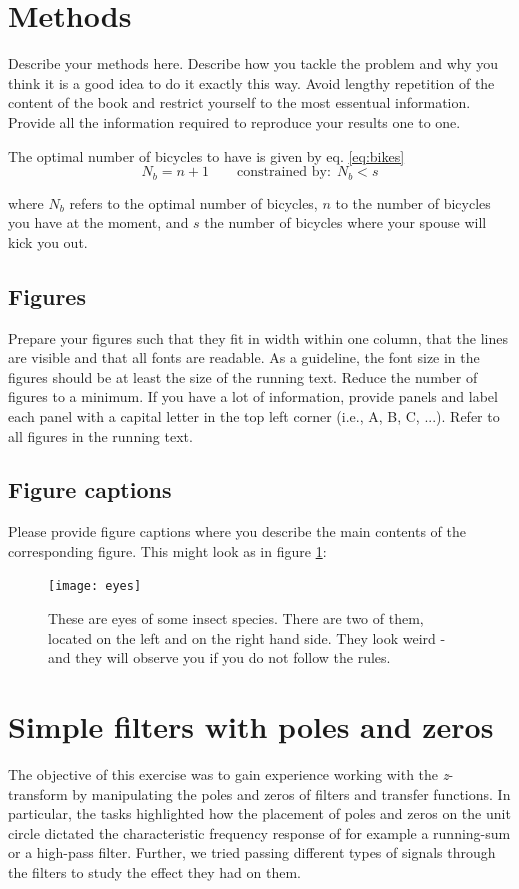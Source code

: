 \documentclass[journal]{IEEEtran}
\begin{document}
\section{Methods}
Describe your methods here. Describe how you tackle the problem and why you think it is a good idea to do it exactly this way. Avoid lengthy repetition of the content of the book and restrict yourself to the most essentual information. Provide all the information required to reproduce your results one to one.

The optimal number of bicycles to have is given by eq. \ref{eq:bikes}
\begin{equation}\label{eq:bikes}
 N_b = n + 1 \qquad \mbox{constrained by:} \ \ N_b < s
\end{equation}

where $N_b$ refers to the optimal number of bicycles, $n$ to the number of bicycles you have at the moment, and $s$ the number of bicycles where your spouse will kick you out.


\subsection{Figures}
Prepare your figures such that they fit in width within one column, that the lines are visible and that all fonts are readable. As a guideline, the font size in the figures should be at least the size of the running text. Reduce the number of figures to a minimum. If you have a lot of information, provide panels and label each panel with a capital letter in the top left corner (i.e., A, B, C, ...). Refer to all figures in the running text.  

\subsection{Figure captions}
Please provide figure captions where you describe the main contents of the corresponding figure. This might look as in figure \ref{fig:eyes}:
\begin{figure}
 \texttt{[image: eyes]}
 \caption{These are eyes of some insect species. There are two of them, located on the left and on the right hand side. They look weird - and they will observe you if you do not follow the rules.}
 \label{fig:eyes}
\end{figure}


\newpage
\section{Simple filters with poles and zeros}
The objective of this exercise was to gain experience working with the \textit{z}-transform by manipulating the poles and zeros of filters and transfer functions. In particular, the tasks highlighted how the placement of poles and zeros on the unit circle dictated the characteristic frequency response of for example a running-sum or a high-pass filter. Further, we tried passing different types of signals through the filters to study the effect they had on them. 
\end{document}

